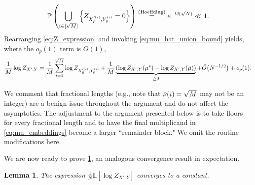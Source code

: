 \documentclass[11pt]{amsart}
\numberwithin{equation}{section}
\numberwithin{equation}{section}
\newcommand{\1}{\mathbbm{1}}
\newcommand{\E}{\mathbb{E}}
\newcommand{\Prob}{\mathbb{P}}
\newtheorem{lemma}[theorem]{Lemma}
\theoremstyle{definition}
\newenvironment{remark}
  {\pushQED{\qed}\renewcommand{\qedsymbol}{$\triangle$}\remarkx}
  {\popQED\endremarkx}
\begin{document}
\begin{align} \label{eq:mu_hat_union_bound}
    \Prob\left(\bigcup_{i \in [\sqrt{M}]} \left\{ Z_{X_{\Bar{\mu}}'^{(i)}, Y_{\Bar{\nu}}^{(i)}} = 0 \right\} \right) \stackrel{\text{(Hoeffding)}}{=} e^{-\Omega(\sqrt{N})} \ll 1.
\end{align}
Rearranging \eqref{eq:Z_expression} and invoking \eqref{eq:mu_hat_union_bound} yields, where the $o_p(1)$ term is $O(1)$,
\begin{align} \label{eq:subsequence_equation_1}
    \frac{1}{M} \log Z_{X',Y} = \frac{1}{M} \sum_{i=1}^{\sqrt{M}} \log Z_{X_{\Bar{\mu}}'^{(i)}, Y_{\Bar{\nu}}^{(i)}} + \frac{1}{M}\underbrace{\left(\log Z_{X', Y}(\mu^*) - \log Z_{X', Y}(\Bar{\mu}) \right)}_{\geq 0} + \Tilde{O}\big( N^{-1/2} \big) + o_p(1).
\end{align} 

\begin{remark}
    We comment that fractional lengths (e.g., note that $\Bar{\nu}(i) = \sqrt{M}$ may not be an integer) are a benign issue throughout the argument and do not affect the asymptotics. The adjustment to the argument presented below is to take floors for every fractional length and to have the final multiplicand in \eqref{eq:mu_embeddings} become a larger ``remainder block." We omit the routine modifications here.
\end{remark}

We are now ready to prove \cref{lem:increasing_expectation}, an analogous convergence result in expectation.
\begin{lemma} \label{lem:increasing_expectation}
    The expression $\frac{1}{N} \E[\log Z_{X',Y}]$ converges to a constant.
\end{lemma}
\end{document}
